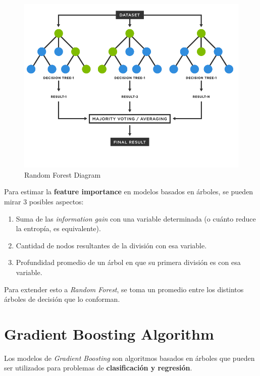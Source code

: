 \begin{figure}[H]
    \center
    \includegraphics[scale=0.25]{notebooks/ML/img/random_forest_diagram.png}
    \caption{Random Forest Diagram}
\end{figure}

Para estimar la \textbf{feature importance} en modelos basados en árboles, se pueden mirar 3 posibles aspectos: 
\begin{enumerate}
    \item Suma de las \textit{information gain} con una variable determinada (o cuánto reduce la entropía, es equivalente). 
    \item Cantidad de nodos resultantes de la división con esa variable. 
    \item Profundidad promedio de un árbol en que su primera división es con esa variable. 
\end{enumerate}

Para extender esto a \textit{Random Forest}, se toma un promedio entre los distintos árboles de decisión que lo conforman. 

\section{Gradient Boosting Algorithm}

Los modelos de \textit{Gradient Boosting} son algoritmos basados en árboles que pueden ser utilizados para problemas de \textbf{clasificación y regresión}. 

